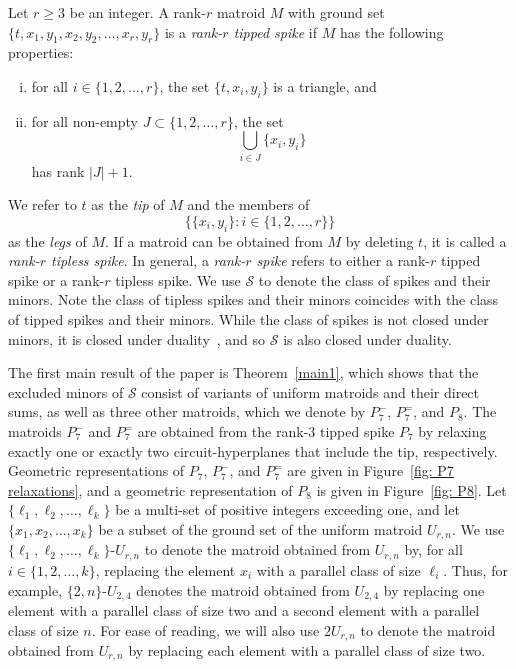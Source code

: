 \documentclass[11pt]{amsart}
\numberwithin{equation}{section} %
\newcommand{\cS}{\mathcal{S}}
\begin{document}
Let $r\ge 3$ be an integer. A rank-$r$ matroid $M$ with ground set $\{t, x_1, y_1, x_2, y_2, \ldots, x_r, y_r\}$ is a {\em rank-$r$ tipped spike} if $M$ has the following properties:
\begin{enumerate}[(i)]
\item for all $i\in \{1, 2, \ldots, r\}$, the set $\{t, x_i, y_i\}$ is a triangle, and

\item for all non-empty $J \subset \{1, 2, \ldots, r\}$, the set
$$
\bigcup_{i \in J} \{x_i, y_i\}
$$
has rank $|J| + 1$.
\end{enumerate}
We refer to $t$ as the {\em tip} of $M$ and the members of
$$\big\{\{x_i, y_i\}: i\in \{1, 2, \ldots, r\}\big\}$$
as the {\em legs} of $M$. If a matroid can be obtained from $M$ by deleting $t$, it is called a {\em rank-$r$ tipless spike}. In general, a {\em rank-$r$ spike} refers to either a rank-$r$ tipped spike or a rank-$r$ tipless spike. We use $\mathcal S$ to denote the class of spikes and their minors. Note the class of tipless spikes and their minors coincides with the class of tipped spikes and their minors. While the class of spikes is not closed under minors, it is closed under duality~\cite{may21}, and so $\cS$ is also closed under duality.

The first main result of the paper is Theorem~\ref{main1}, which shows that the excluded minors of $\cS$ consist of variants of uniform matroids and their direct sums, as well as three other matroids, which we denote by $P_7^-$, $P_7^=$, and $P_8$. The matroids $P_7^-$ and $P_7^=$ are obtained from the rank-$3$ tipped spike $P_7$ by relaxing exactly one or exactly two circuit-hyperplanes that include the tip, respectively. Geometric representations of $P_7$, $P_7^-$, and $P_7^=$ are given in Figure~\ref{fig: P7 relaxations}, and a geometric representation of $P_8$ is given in Figure~\ref{fig: P8}. Let $\{\ell_1, \ell_2, \ldots, \ell_k\}$ be a multi-set of positive integers exceeding one, and let $\{x_1, x_2, \ldots, x_k\}$ be a subset of the ground set of the uniform matroid $U_{r, n}$. We use $\{\ell_1, \ell_2, \ldots, \ell_k\}$-$U_{r, n}$ to denote the matroid obtained from $U_{r, n}$ by, for all $i\in \{1, 2, \ldots, k\}$, replacing the element $x_i$ with a parallel class of size $\ell_i$. Thus, for example, $\{2, n\}$-$U_{2, 4}$ denotes the matroid obtained from $U_{2, 4}$ by replacing one element with a parallel class of size two and a second element with a parallel class of size $n$. For ease of reading, we will also use $2U_{r, n}$ to denote the matroid obtained from $U_{r, n}$ by replacing each element with a parallel class of size two.
\end{document}
